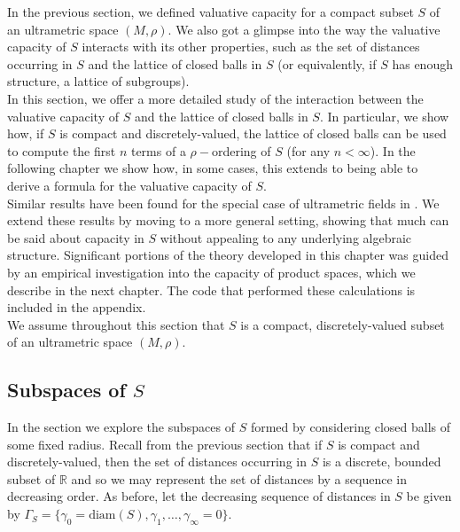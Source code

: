
In the previous section, we defined valuative capacity for a compact subset $S$ of an ultrametric space $(M, \rho)$. We also got a glimpse into the way the valuative capacity of $S$ interacts with its other properties, such as the set of distances occurring in $S$ and the lattice of closed balls in $S$ (or equivalently, if $S$ has enough structure, a lattice of subgroups).\\

In this section, we offer a more detailed study of the interaction between the valuative capacity of $S$ and the lattice of closed balls in $S$. In particular, we  show how, if $S$ is compact and discretely-valued, the lattice of closed balls can be used to compute the first $n$ terms of a $\rho-$ordering of $S$ (for any $n < \infty$). In the following chapter we show how, in some cases, this extends to being able to derive a formula for the valuative capacity of $S$.\\

Similar results have been found for the special case of ultrametric fields in \cite{cef}. We extend these results by moving to a more general setting, showing that much can be said about capacity in $S$ without appealing to any underlying algebraic structure. Significant portions of the theory developed in this chapter was guided by an empirical investigation into the capacity of product spaces, which we describe in the next chapter. The code that performed these calculations is included in the appendix.\\

We assume throughout this section that $S$ is a compact, discretely-valued subset of an ultrametric space $(M, \rho)$.\\

\subsection*{Subspaces of $S$}
In the section we explore the subspaces of $S$ formed by considering closed balls of some fixed radius.  Recall from the previous section that if $S$ is compact and discretely-valued, then the set of distances occurring in $S$ is a discrete, bounded subset of $\mathbb{R}$ and so we may represent the set of distances by a sequence in decreasing order. As before, let the decreasing sequence of distances in $S$ be given by  $\Gamma_S =\{\gamma_0=\text{diam}(S), \gamma_1,\ldots,\gamma_\infty=0\}$.\\


